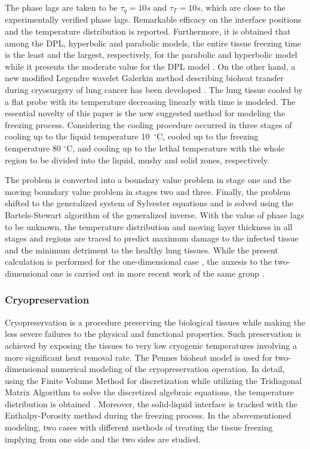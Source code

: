 \documentclass[sn-mathphys]{sn-jnl}%
\theoremstyle{thmstyleone}%
\theoremstyle{thmstyletwo}%
\theoremstyle{thmstylethree}%
\begin{document}
{The phase lags are taken to be  $\tau_q=10 s$ and $\tau_T=10 s$, which are close to the experimentally verified phase lags. Remarkable efficacy on the interface positions and the temperature distribution is reported. Furthermore, it is obtained that among the DPL, hyperbolic and parabolic models, the entire tissue freezing time is the least and the largest, respectively, for the parabolic and hyperbolic model while it presents the moderate value for the DPL model \cite{SKumar2018}. On the other hand, a new modified Legendre wavelet Galerkin method describing bioheat transfer during cryosurgery of lung cancer has been developed \cite{MKumar20181}. The lung tissue cooled by a flat probe with its temperature decreasing linearly with time is modeled. The essential novelty of this paper is the new suggested method for modeling the freezing process. Considering the cooling procedure occurred in three stages of cooling up to the liquid temperature 10~$^\circ$C, cooled up to the freezing temperature 80 $^\circ$C, and cooling up to the lethal temperature with the whole region to be divided into the liquid, mushy and solid zones, respectively.

The problem is converted into a boundary value problem in stage one and the moving boundary value problem in stages two and three. Finally, the problem shifted to the generalized system of Sylvester equations and is solved using the Bartels-Stewart algorithm of the generalized inverse. With the value of phase lags to be unknown, the temperature distribution and moving layer thickness in all stages and regions are traced to predict maximum damage to the infected tissue and the minimum detriment to the healthy lung tissues. While the present calculation is performed for the one-dimensional case \cite{MKumar20181}, the auxesis to the two-dimensional one is carried out in more recent work of the same group \cite{MKumar2019}.

\subsubsection{Cryopreservation}
Cryopreservation is a procedure preserving the biological tissues while making the less severe failures to the physical and functional properties. Such preservation is achieved by exposing the tissues to very low cryogenic temperatures involving a more significant heat removal rate. The Pennes bioheat model is used for two-dimensional numerical modeling of the cryopreservation operation. In detail, using the Finite Volume Method for discretization while utilizing the Tridiagonal Matrix Algorithm to solve the discretized algebraic equations, the temperature distribution is obtained \cite{Sukumar2019}. Moreover, the solid-liquid interface is tracked with the Enthalpy-Porosity method during the freezing process. In the abovementioned modeling, two cases with different methods of treating the tissue freezing implying from one side and the two sides are studied.

}
\end{document}
